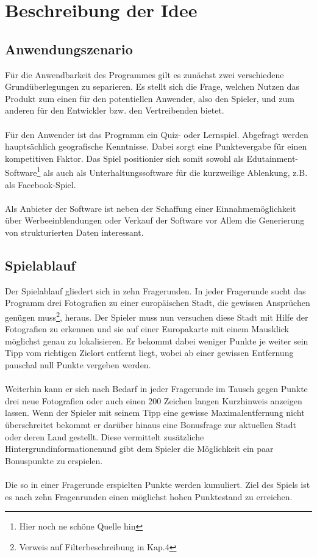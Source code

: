 \documentclass[a4paper, 11pt]{article}
\begin{document}
\section{Beschreibung der Idee}
\subsection{Anwendungszenario}
Für die Anwendbarkeit des Programmes gilt es zunächst zwei verschiedene Grundüberlegungen zu separieren. Es stellt sich die Frage, welchen Nutzen das Produkt zum einen für den potentiellen Anwender, also den Spieler, und zum anderen für den Entwickler bzw. den Vertreibenden bietet.\\\\Für den Anwender ist das Programm ein Quiz- oder Lernspiel. Abgefragt werden hauptsächlich geografische Kenntnisse. Dabei sorgt eine Punktevergabe für einen kompetitiven Faktor. Das Spiel positionier sich somit sowohl als Edutainment-Software\footnote{Hier noch ne schöne Quelle hin} als auch als Unterhaltungssoftware für die kurzweilige Ablenkung, z.B. als Facebook-Spiel.\\\\
Als Anbieter der Software ist neben der Schaffung einer Einnahmemöglichkeit über Werbeeinblendungen oder Verkauf der Software vor Allem die Generierung von strukturierten Daten interessant. 
\subsection{Spielablauf}
Der Spielablauf gliedert sich in zehn Fragerunden. In jeder Fragerunde sucht das Programm drei Fotografien zu einer europäischen Stadt, die gewissen Ansprüchen genügen muss\footnote{Verweis auf Filterbeschreibung in Kap.4}, heraus. Der Spieler muss nun versuchen diese Stadt mit Hilfe der Fotografien zu erkennen und sie auf einer Europakarte mit einem Mausklick möglichst genau zu lokalisieren. Er bekommt dabei weniger Punkte je weiter sein Tipp vom richtigen Zielort entfernt liegt, wobei ab einer gewissen Entfernung pauschal null Punkte vergeben werden.\\\\ Weiterhin kann er sich nach Bedarf in jeder Fragerunde im Tausch gegen Punkte drei neue Fotografien oder auch einen 200 Zeichen langen Kurzhinweis anzeigen lassen. Wenn der Spieler mit seinem Tipp eine gewisse Maximalentfernung nicht überschreitet bekommt er darüber hinaus eine Bonusfrage zur aktuellen Stadt oder deren Land gestellt. Diese vermittelt zusätzliche Hintergrundinformationenund gibt dem Spieler die Möglichkeit ein paar Bonuspunkte zu erspielen.\\\\ 
Die so in einer Fragerunde erspielten Punkte werden kumuliert. Ziel des Spiels ist es nach zehn Fragenrunden einen möglichst hohen Punktestand zu erreichen.
\end{document}
